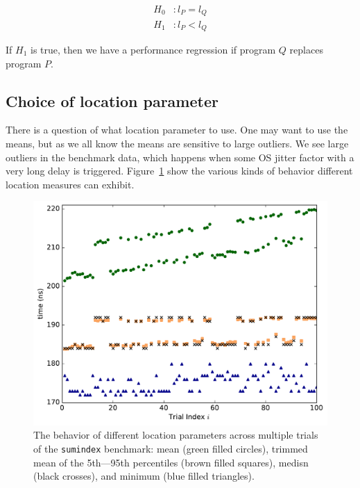 \documentclass[conference]{IEEEtran}
\begin{document}
\begin{subequations}
\begin{align}
H_0&: l_P = l_Q \\
H_1&: l_P < l_Q
\end{align}
\end{subequations}

If $H_1$ is true, then we have a performance regression if program $Q$ replaces program $P$.


\subsection{Choice of location parameter}

There is a question of what location parameter to use.
One may want to use the means, but as we all know the means are sensitive to large outliers. We see large outliers in the benchmark data, which happens when some OS jitter factor with a very long delay is triggered.
Figure~\ref{fig:locationmeasures} show the various kinds of behavior different location measures can exhibit.

\begin{figure}
\centering
\includegraphics[width=\columnwidth]{figures/fig3/location_estimators_sumindex}
\caption{The behavior of different location parameters across multiple trials of
the \lstinline|sumindex| benchmark: mean (green filled circles), trimmed mean of
the 5th---95th percentiles (brown filled squares), medisn (black crosses), and
minimum (blue filled triangles).}
\label{fig:locationmeasures}
\end{figure}
\end{document}
